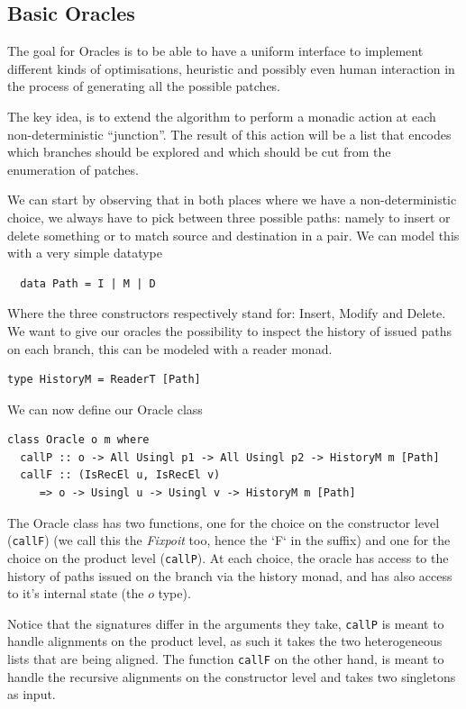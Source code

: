 \documentclass[11pt, titlepage]{article}
\newcommand{\toHaskell}[1]{\texttt{#1}\xspace}
\begin{document}
\subsection{Basic Oracles}\label{oracles}
The goal for Oracles is to be able to have a uniform interface to implement different kinds of optimisations, heuristic and possibly even human interaction in the process of generating all the possible patches.
 
The key idea, is to extend the algorithm to perform a monadic action at each non-deterministic ``junction''. The result of this action will be a list that encodes which branches should be explored and which should be cut from the enumeration of patches.

We can start by observing that in both places where we have a non-deterministic choice, we always have to pick between three possible paths: namely to insert or delete something or to match source and destination in a pair. We can model this with a very simple datatype

\begin{verbatim}
  data Path = I | M | D 
\end{verbatim}

Where the three constructors respectively stand for: Insert, Modify and Delete.
We want to give our oracles the possibility to inspect the history of issued paths on each branch, this can be modeled with a reader monad.

\begin{verbatim}
type HistoryM = ReaderT [Path]
\end{verbatim}

We can now define our Oracle class

\begin{verbatim}
class Oracle o m where
  callP :: o -> All Usingl p1 -> All Usingl p2 -> HistoryM m [Path]
  callF :: (IsRecEl u, IsRecEl v) 
	 => o -> Usingl u -> Usingl v -> HistoryM m [Path]
\end{verbatim}

The Oracle class has two functions, one for the choice on the constructor level (\toHaskell{callF}) (we call this the \textit{Fixpoit} too, hence the `F` in the suffix) and one for the choice on the product level (\toHaskell{callP}). At each choice, the oracle has access to the history of paths issued on the branch via the history monad, and  has also access to it's internal state (the $o$ type).

Notice that the signatures differ in the arguments they take, \toHaskell{callP} is meant to handle alignments on the product level, as such it takes the two heterogeneous lists that are being aligned. The function \toHaskell{callF} on the other hand, is meant to handle the recursive alignments on the constructor level and takes two singletons as input.
 
\end{document}
